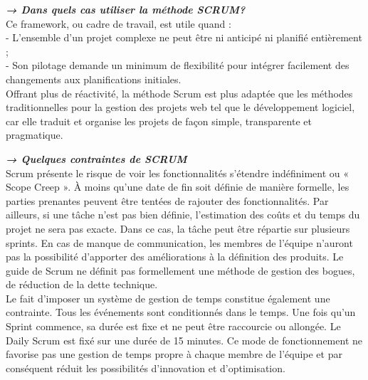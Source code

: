 \textbf{\textit{→ Dans quels cas utiliser la méthode SCRUM? }}\\
Ce framework, ou cadre de travail, est utile quand : \\
	- L’ensemble d’un projet complexe ne peut être ni anticipé ni planifié entièrement ; \\
	- Son pilotage demande un minimum de flexibilité pour intégrer facilement des changements aux planifications initiales.  \\
Offrant plus de réactivité, la méthode Scrum est plus adaptée que les méthodes traditionnelles pour la gestion des projets web tel que le développement logiciel, car elle traduit et organise les projets de façon simple, transparente et pragmatique. 


\textbf{\textit{→ Quelques contraintes de SCRUM }}\\
	Scrum présente le risque de voir les fonctionnalités s’étendre indéfiniment ou « Scope Creep ». À moins qu’une date de fin soit définie de manière formelle, les parties prenantes peuvent être tentées de rajouter des fonctionnalités. Par ailleurs, si une tâche n'est pas bien définie, l'estimation des coûts et du temps du projet ne sera pas exacte. Dans ce cas, la tâche peut être répartie sur plusieurs sprints. 
	En cas de manque de communication, les membres de l’équipe n’auront pas la possibilité d’apporter des améliorations à la définition des produits. Le guide de Scrum ne définit pas formellement une méthode de gestion des bogues, de réduction de la dette technique. \\ 
	Le fait d’imposer un système de gestion de temps constitue également une contrainte. Tous les événements sont conditionnés dans le temps. Une fois qu'un Sprint commence, sa durée est fixe et ne peut être raccourcie ou allongée. Le Daily Scrum est fixé sur une durée de 15 minutes. Ce mode de fonctionnement ne favorise pas une gestion de temps propre à chaque membre de l’équipe et par conséquent réduit les possibilités d’innovation et d’optimisation.

